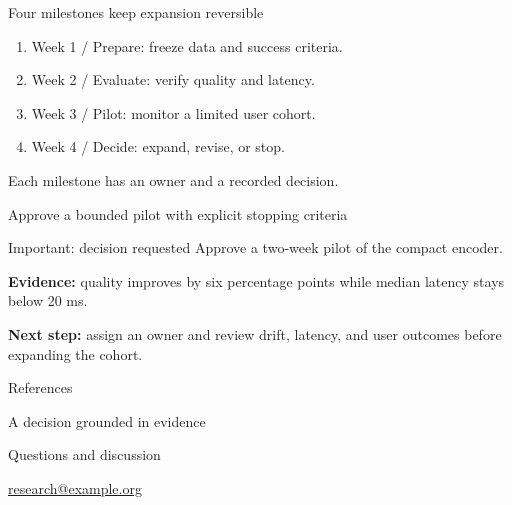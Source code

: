 \documentclass[11pt,aspectratio=169]{beamer}
\begin{document}
\begin{frame}{Four milestones keep expansion reversible}
  \begin{enumerate}
    \item \textcolor{TempusAccent}{Week 1 / Prepare}: freeze data and success criteria.
    \item \textcolor{TempusTeal}{Week 2 / Evaluate}: verify quality and latency.
    \item \textcolor{TempusAmber}{Week 3 / Pilot}: monitor a limited user cohort.
    \item \textcolor{TempusBurgundy}{Week 4 / Decide}: expand, revise, or stop.
  \end{enumerate}
  \medskip\textcolor{TempusMuted}{Each milestone has an owner and a recorded decision.}
\end{frame}
\begin{frame}{Approve a bounded pilot with explicit stopping criteria}
  \begin{importantblock}{Important: decision requested}
    Approve a two-week pilot of the compact encoder.
  \end{importantblock}
  \textbf{Evidence:} quality improves by six percentage points while
  median latency stays below 20 ms.\par\medskip
  \textbf{Next step:} assign an owner and review drift, latency, and user outcomes
  before expanding the cohort.
\end{frame}
\begin{frame}{References}
  
  
\end{frame}
\begin{frame}[plain]
  \reportlogomark\par\bigskip
  {\textcolor{TempusAccent}{A decision grounded in evidence}}\par
  \medskip Questions and discussion\par\medskip
  \href{mailto:research@example.org}{research@example.org}
\end{frame}
\end{document}
